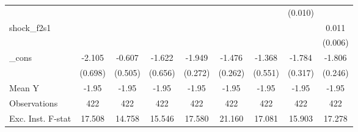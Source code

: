 {\begin{tabular}{l*{8}{c}}
            &                     &                     &                     &                     &                     &                     &     (0.010)         &                     \\
\addlinespace
shock\_f2s1  &                     &                     &                     &                     &                     &                     &                     &       0.011         \\
            &                     &                     &                     &                     &                     &                     &                     &     (0.006)         \\
\addlinespace
\_cons      &      -2.105\sym{***}&      -0.607         &      -1.622\sym{**} &      -1.949\sym{***}&      -1.476\sym{***}&      -1.368\sym{**} &      -1.784\sym{***}&      -1.806\sym{***}\\
            &     (0.698)         &     (0.505)         &     (0.656)         &     (0.272)         &     (0.262)         &     (0.551)         &     (0.317)         &     (0.246)         \\
\midrule
Mean Y      &       -1.95         &       -1.95         &       -1.95         &       -1.95         &       -1.95         &       -1.95         &       -1.95         &       -1.95         \\
Observations&         422         &         422         &         422         &         422         &         422         &         422         &         422         &         422         \\
Exc. Inst. F-stat&      17.508         &      14.758         &      15.546         &      17.580         &      21.160         &      17.081         &      15.903         &      17.278         \\
\bottomrule
\end{tabular}
}
